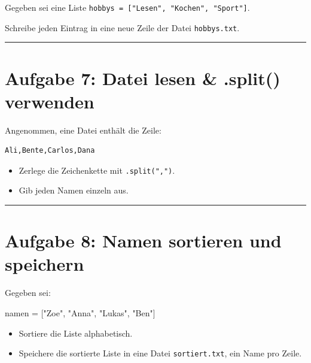 \documentclass[
  letterpaper,
  DIV=11,
  numbers=noendperiod]{scrreprt}
\newenvironment{Shaded}{\begin{snugshade}}{\end{snugshade}}
\newcommand{\NormalTok}[1]{\textcolor[rgb]{0.00,0.23,0.31}{#1}}
\newcommand{\OperatorTok}[1]{\textcolor[rgb]{0.37,0.37,0.37}{#1}}
\newcommand{\StringTok}[1]{\textcolor[rgb]{0.13,0.47,0.30}{#1}}
\providecommand{\tightlist}{%
  \setlength{\itemsep}{0pt}\setlength{\parskip}{0pt}}\usepackage{longtable,booktabs,array}
\begin{document}
Gegeben sei eine Liste
\texttt{hobbys\ =\ {[}"Lesen",\ "Kochen",\ "Sport"{]}}.

Schreibe jeden Eintrag in eine neue Zeile der Datei \texttt{hobbys.txt}.

\begin{center}\rule{0.5\linewidth}{0.5pt}\end{center}

\section{Aufgabe 7: Datei lesen \& .split()
verwenden}\label{aufgabe-7-datei-lesen-.split-verwenden}

Angenommen, eine Datei enthält die Zeile:

\begin{verbatim}
Ali,Bente,Carlos,Dana
\end{verbatim}

\begin{itemize}
\tightlist
\item
  Zerlege die Zeichenkette mit \texttt{.split(",")}.
\item
  Gib jeden Namen einzeln aus.
\end{itemize}

\begin{center}\rule{0.5\linewidth}{0.5pt}\end{center}

\section{Aufgabe 8: Namen sortieren und
speichern}\label{aufgabe-8-namen-sortieren-und-speichern}

Gegeben sei:

\begin{Shaded}
\begin{Highlighting}[]
\NormalTok{namen }\OperatorTok{=}\NormalTok{ [}\StringTok{"Zoe"}\NormalTok{, }\StringTok{"Anna"}\NormalTok{, }\StringTok{"Lukas"}\NormalTok{, }\StringTok{"Ben"}\NormalTok{]}
\end{Highlighting}
\end{Shaded}

\begin{itemize}
\tightlist
\item
  Sortiere die Liste alphabetisch.
\item
  Speichere die sortierte Liste in eine Datei \texttt{sortiert.txt}, ein
  Name pro Zeile.
\end{itemize}
\end{document}
